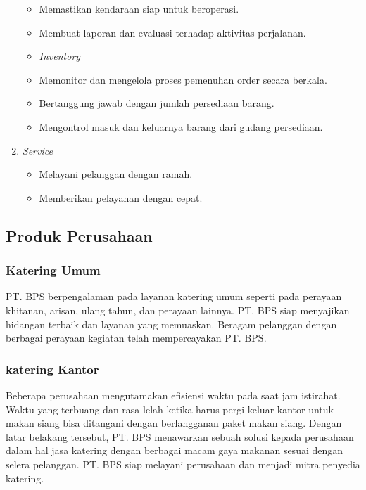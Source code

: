 \begin{enumerate}
\begin{itemize}
        \item Memastikan kendaraan siap untuk beroperasi.
        \item Membuat laporan dan evaluasi terhadap aktivitas perjalanan.
        \item \emph{Inventory} 
        \item Memonitor dan mengelola proses pemenuhan order secara berkala.
        \item Bertanggung jawab dengan jumlah persediaan barang.
        \item Mengontrol masuk dan keluarnya barang dari gudang persediaan.
        \end{itemize}
    \item \emph{Service}
    \begin{itemize}
    \item Melayani pelanggan dengan ramah.
    \item Memberikan pelayanan dengan cepat.
    \end{itemize}
\end{enumerate}

\subsection{Produk Perusahaan}

\subsubsection{Katering Umum}

PT. BPS berpengalaman pada layanan katering umum seperti pada perayaan khitanan, 
arisan, ulang tahun, dan perayaan lainnya. PT. BPS siap menyajikan hidangan terbaik dan layanan yang memuaskan. 
Beragam pelanggan dengan berbagai perayaan kegiatan telah mempercayakan PT. BPS.

\subsubsection{katering Kantor}
Beberapa perusahaan mengutamakan efisiensi waktu pada saat jam istirahat. 
Waktu yang terbuang dan rasa lelah ketika harus pergi keluar kantor untuk makan 
siang bisa ditangani dengan berlangganan paket makan siang. Dengan latar belakang tersebut, 
PT. BPS menawarkan sebuah solusi kepada perusahaan dalam hal jasa katering dengan berbagai 
macam gaya makanan sesuai dengan selera pelanggan. 
PT. BPS siap melayani perusahaan dan menjadi mitra penyedia katering.

